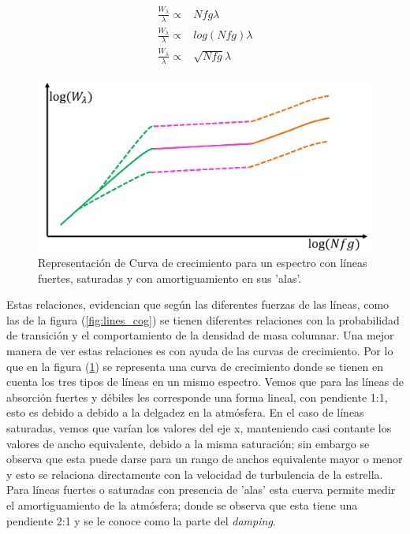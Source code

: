 \documentclass[12pt,oneside,openany,letter]{book}
\begin{document}
\begin{equation}
    \begin{array}{cc}
         \frac{W_{\lambda}}{\lambda} \propto& Nfg\lambda  \\
         \frac{W_{\lambda}}{\lambda} \propto& log(Nfg)\lambda  \\
         \frac{W_{\lambda}}{\lambda} \propto& \sqrt{Nfg}\lambda
    \end{array}
    \label{ec:relation_W_fg}
\end{equation}

\begin{figure}[h]
    \centering
    \includegraphics[width=0.75\linewidth]{Images/goc.png}
    \caption{Representación de Curva de crecimiento para un espectro con líneas fuertes, saturadas y con amortiguamiento en sus 'alas'.}
    \label{fig:GoC}
\end{figure}

Estas relaciones, evidencian que según las diferentes fuerzas de las líneas, como las de la figura (\ref{fig:lines_cog}) se tienen diferentes relaciones con la probabilidad de transición y el comportamiento de la densidad de masa columnar.  Una mejor manera de ver estas relaciones es con ayuda de las curvas de crecimiento. Por lo que en la figura (\ref{fig:GoC}) se representa una curva de crecimiento donde se tienen en cuenta los tres tipos de líneas en un mismo espectro. Vemos que para las líneas de absorción fuertes y débiles les corresponde una forma lineal, con pendiente 1:1, esto es debido a debido a la delgadez en la atmósfera. En el caso de líneas saturadas, vemos que varían los valores del eje x, manteniendo casi contante los valores de ancho equivalente, debido a la misma saturación; sin embargo se observa que esta puede darse para un rango de anchos equivalente mayor o menor y esto se relaciona directamente con la velocidad de turbulencia de la estrella. Para líneas fuertes o saturadas con presencia de 'alas' esta cuerva permite medir el amortiguamiento de la atmósfera; donde se observa que esta tiene una pendiente 2:1 y se le conoce como la parte del \textit{damping}.
\end{document}
